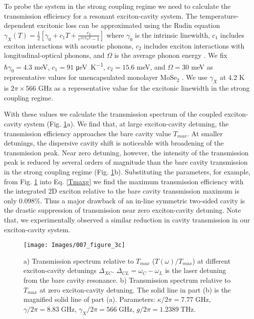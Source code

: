 \documentclass{achemso}
\begin{document}
To probe the system in the strong coupling regime we need to calculate the transmission efficiency for a resonant exciton-cavity system. The temperature-dependent excitonic loss can be approximated using the Rudin equation $\gamma_{X} (T) = \frac{1}{2} [ \gamma_{0} + c_{1} T + \frac{c_{2}}{e^{\Omega/{k_{B} T}} - 1}]$ where $\gamma_{0}$ is the intrinsic linewidth, $c_{1}$ includes exciton interactions with acoustic phonons, $c_{2}$ includes exciton interactions with longitudinal-optical phonons, and $\Omega$ is the average phonon energy \cite{rudin_temperature-dependent_1990}. We fix $\hbar \gamma_{0} = 4.3$ \si{\milli \electronvolt}, $c_{1} = 91$ \si{\micro \electronvolt \kelvin^{-1}}, $c_{2} = 15.6$ \si{\milli \electronvolt}, and $\Omega = 30$ \si{\milli \electronvolt} as representative values for unencapsulated monolayer $\mathrm{MoSe}_{2}$ \cite{selig_excitonic_2016}. We use $\gamma_{X}$ at 4.2 \si{\kelvin} is $2 \pi \times 566$ \si{\giga \hertz} as a representative value for the excitonic linewidth in the strong coupling regime. 

With these values we calculate the transmission spectrum of the coupled exciton-cavity system (Fig. \ref{fig:003figure3}a). We find that, at large exciton-cavity detuning, the transmission efficiency approaches the bare cavity value $T_{max}$.  At smaller detunings, the dispersive cavity shift is noticeable with broadening of the transmission peak. Near zero detuning, however, the intensity of the transmission peak is reduced by several orders of magnitude than the bare cavity transmission in the strong coupling regime (Fig. \ref{fig:003figure3}b). Substituting the parameters, for example, from Fig. \ref{fig:003figure3} into Eq. \ref{Tmaxg} we find the maximum transmission efficiency with the integrated 2D exciton relative to the bare cavity transmission maximum is only $0.098\%$. Thus a major drawback of an in-line symmetric two-sided cavity is the drastic suppression of transmission near zero exciton-cavity detuning. Note that, we experimentally observed a similar reduction in cavity transmission in our exciton-cavity system\cite{rosser_dispersive_2020}. 

\begin{figure}
	\centering
	\texttt{[image: Images/007\_figure\_3c]}
	\caption{a) Transmission spectrum relative to $T_{max}$ ($T(\omega) / T_{max}$) at different exciton-cavity detunings $\Delta_{XC}$. $\Delta_{CL} = \omega_{C} - \omega_{L}$ is the laser detuning from the bare cavity resonance. b) Transmission spectrum relative to $T_{max}$ at zero exciton-cavity detuning. The solid line in part (b) is the magnified solid line of part (a). Parameters: $\kappa/2\pi = 7.77 \; \si{\giga \hertz}$, $\gamma/2\pi = 8.83 \; \si{\giga \hertz}$, $\gamma_{X}/2\pi = 566 \; \si{\giga \hertz}$, $g/2\pi = 1.2389 \; \si{\tera \hertz}$.}
	\label{fig:003figure3}
\end{figure}
\end{document}
